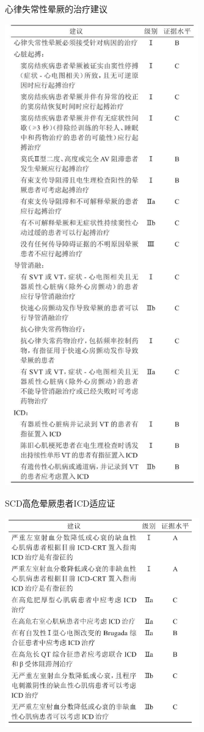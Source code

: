 \begin{table}[htbp]
\centering
\caption{心律失常性晕厥的治疗建议}
\label{tab4-13}
\includegraphics[width=3.29167in,height=7.86458in]{./images/Image00031.jpg}
\end{table}

\begin{table}[htbp]
\centering
\caption{SCD高危晕厥患者ICD适应证}
\label{tab4-14}
\includegraphics[width=3.3125in,height=3.55208in]{./images/Image00032.jpg}
\end{table}

